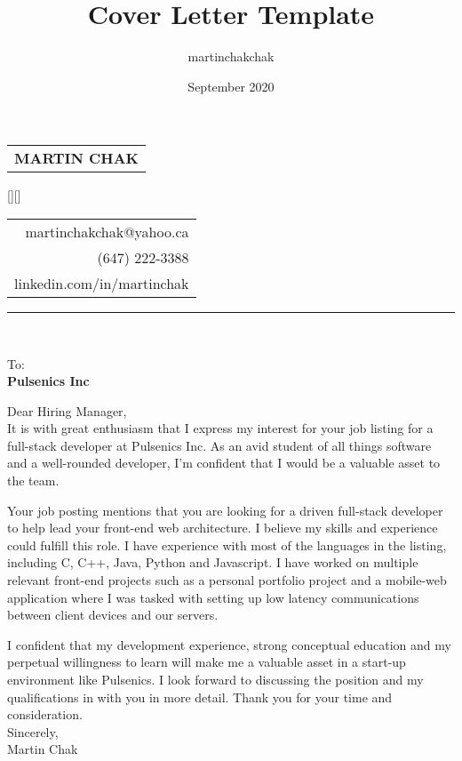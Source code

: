 \documentclass[12pt,letterpaper]{article}
\title{Cover Letter Template}
\author{martinchakchak }
\date{September 2020}
\begin{document}
\noindent
\begin{spacing}{1.125}
    \vfill\noindent
    \begin{tabular}[t]{@{}l} 
      \MakeUppercase{\fontsize{18pt}{5pt}\bf Martin Chak}
    \end{tabular}
    \hfill
    \hspace*{7.5cm}
    \raisebox{0.15cm}[\height][\depth]{
        \begin{tabular}[t]{r}
            martinchakchak@yahoo.ca\\
            (647) 222-3388\\
            linkedin.com/in/martinchak
        \end{tabular}
    }
\end{spacing}

\hrule



\noindent\\

\noindent
{\fontsize{10pt}{5pt}To:}\\
{\bf Pulsenics Inc}\\

\begin{text}
    Dear Hiring Manager,\\
    
    It is with great enthusiasm that I express my interest for your job listing for a full-stack developer at Pulsenics Inc. As an avid student of all things software and a well-rounded developer, I'm confident that I would be a valuable asset to the team.
    
    Your job posting mentions that you are looking for a driven full-stack developer to help lead your front-end web architecture. I believe my skills and experience could fulfill this role. I have experience with most of the languages in the listing, including C, C++, Java, Python and Javascript. I have worked on multiple relevant front-end projects such as a personal portfolio project and a mobile-web application where I was tasked with setting up low latency communications between client devices and our servers.
    
    I confident that my development experience, strong conceptual education and my perpetual willingness to learn will make me a valuable asset in a start-up environment like Pulsenics. I look forward to discussing the position and my qualifications in with you in more detail. Thank you for your time and consideration.\\
    
    Sincerely,\\
    Martin Chak
\end{text}
\end{document}
